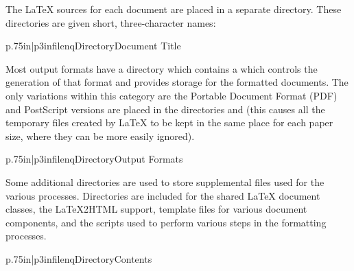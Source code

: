\documentclass{howto}
\begin{document}
  \begin{definitions}
	The \LaTeX{} sources for each document are placed in a
	separate directory.  These directories are given short,
	three-character names:

	\begin{tableii}{p{.75in}|p{3in}}{filenq}{Directory}{Document Title}
            {}
            {}
            {}
            {}
            {}
            {}
            {}
            {}
            {}
	\end{tableii}

	Most output formats have a directory which contains a
	 which controls the generation of that format
	and provides storage for the formatted documents.  The only
	variations within this category are the Portable Document
        Format (PDF) and PostScript versions are placed in the
	directories  and  (this
	causes all the temporary files created by \LaTeX{} to be kept
	in the same place for each paper size, where they can be more
	easily ignored).

	\begin{tableii}{p{.75in}|p{3in}}{filenq}{Directory}{Output Formats}
	\end{tableii}

	Some additional directories are used to store supplemental
	files used for the various processes.  Directories are
	included for the shared \LaTeX{} document classes, the
	\LaTeX2HTML support, template files for various document
	components, and the scripts used to perform various steps in
	the formatting processes.

	\begin{tableii}{p{.75in}|p{3in}}{filenq}{Directory}{Contents}
	\end{tableii}

  \end{definitions}
\end{document}
